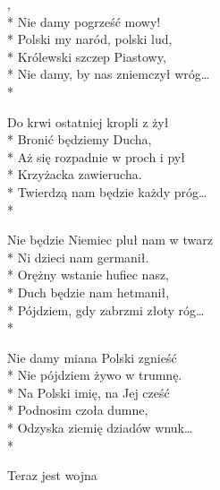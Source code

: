 \begin{lyrics}[longestline={Nie będzie Niemiec pluł nam w twarz}]

,\\*
Nie damy pogrześć mowy!\\*
Polski my naród, polski lud,\\*
Królewski szczep Piastowy,\\*
Nie damy, by nas zniemczył wróg\ldots\\*

Do krwi ostatniej kropli z żył\\*
Bronić będziemy Ducha,\\*
Aż się rozpadnie w proch i pył\\*
Krzyżacka zawierucha.\\*
Twierdzą nam będzie każdy próg\ldots\\*

Nie będzie Niemiec pluł nam w twarz\\*
Ni dzieci nam germanił.\\*
Orężny wstanie hufiec nasz,\\*
Duch będzie nam hetmanił,\\*
Pójdziem, gdy zabrzmi złoty róg\ldots\\*

Nie damy miana Polski zgnieść\\*
Nie pójdziem żywo w trumnę.\\*
Na Polski imię, na Jej cześć\\*
Podnosim czoła dumne,\\*
Odzyska ziemię dziadów wnuk\ldots\\*
\end{lyrics}



\song
{Teraz jest wojna}

